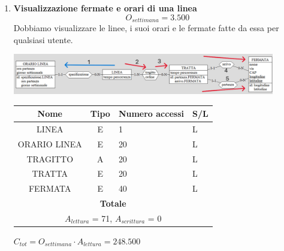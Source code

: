 \documentclass[12pt,a4paper]{report}
\begin{document}
\begin{enumerate}[label=\textbf{\arabic*)}]
        \item \textbf{Visualizzazione fermate e orari di una linea} \label{op2} \\
        \[ {O_{settimana} = 3.500} \]
        Dobbiamo visualizzare le linee, i suoi orari e le fermate fatte da essa per qualsiasi utente.
        \begin{center}
	    \includegraphics[width=0.9\textwidth]{op_2}
	    \end{center}
        \begin{table}[H]
	\centering
        \begin{tabular}{|c|c|l|l|}
        \hline
        \textbf{Nome} & \textbf{Tipo} & \textbf{Numero accessi} & \textbf{S/L} \\
        \hline
        LINEA & E & 1 & L \\
        \hline
        ORARIO LINEA & E & 20 & L \\
        \hline
        TRAGITTO & A & 20 & L \\
        \hline
        TRATTA & E & 20 & L \\
        \hline
        FERMATA & E & 40 & L \\
        \hline
        \multicolumn{4}{c}{\textbf{Totale}} \\
        \multicolumn{4}{c}{${A_{lettura}}$ = 71, ${A_{scrittura}}$ = 0} \\
        \hline
        \end{tabular}
        \end{table}
        \begin{center}
        ${C_{tot} = {O_{settimana}}\cdot{A_{lettura}} = 248.500}$
        \end{center}



\end{enumerate}
\end{document}
